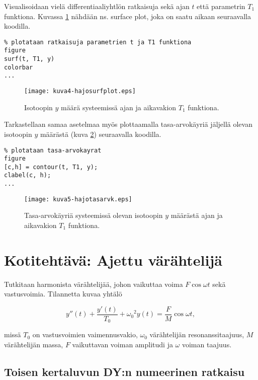 \documentclass[a4paper,11pt]{article}
\begin{document}
Visualisoidaan vielä differentiaaliyhtlön ratkaisuja sekä ajan $t$ että parametrin $T_1$ funktiona. Kuvassa \ref{fig:surf} nähdään ns. surface plot, joka on saatu aikaan seuraavalla koodilla.
\begin{lstlisting}
% plotataan ratkaisuja parametrien t ja T1 funktiona
figure
surf(t, T1, y)
colorbar
...
\end{lstlisting}

\begin{figure}
    \centering
    \texttt{[image: kuva4-hajosurfplot.eps]}
    \caption{Isotoopin $y$ määrä systeemissä ajan ja aikavakion $T_1$ funktiona.}
    \label{fig:surf}
\end{figure}

Tarkastellaan samaa asetelmaa myös plottaamalla tasa-arvokäyriä jäljellä olevan isotoopin $y$ määrästä (kuva \ref{fig:contour}) seuraavalla koodilla.

\begin{lstlisting}
% plotataan tasa-arvokayrat
figure
[c,h] = contour(t, T1, y);
clabel(c, h);
...
\end{lstlisting}

\begin{figure}[!htb]
    \centering
    \texttt{[image: kuva5-hajotasarvk.eps]}
    \caption{Tasa-arvokäyriä systeemissä olevan isotoopin $y$ määrästä ajan ja aikavakion $T_1$ funktiona.}
    \label{fig:contour}
\end{figure}

\section{Kotitehtävä: Ajettu värähtelijä}

Tutkitaan harmonista värähtelijää, johon vaikuttaa voima $F\cos{\omega t}$ sekä vastusvoimia. Tilannetta kuvaa yhtälö

\begin{equation}
    y''(t)+\frac{y'(t)}{T_0}+{\omega_0}^2 y(t) = \frac{F}{M}\cos{\omega t},
\end{equation}

missä $T_0$ on vastusvoimien vaimennusvakio, $\omega_0$ värähtelijän resonanssitaajuus, $M$ värähtelijän massa, $F$ vaikuttavan voiman amplitudi ja $\omega$ voiman taajuus.

\subsection{Toisen kertaluvun DY:n numeerinen ratkaisu}
\end{document}
